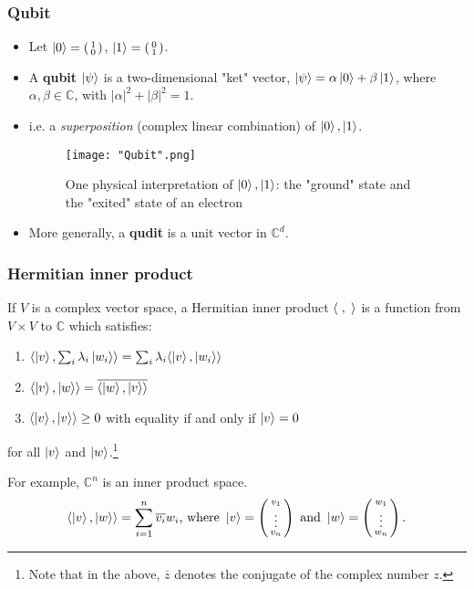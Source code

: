 \documentclass[handout, 10 pt]{beamer}
\newcommand{\icol}[1]{%
  \left(\begin{smallmatrix}#1\end{smallmatrix}\right)%
}
\begin{document}
\begin{frame}
\frametitle{Qubit}

\begin{itemize}
    \item Let $\ket{0} = \icol{1\\0}$, $\ket{1} = \icol{0\\1}$.
    \pause
    \item A \textbf{qubit} $\ket{\psi}$ is a two-dimensional "ket" vector, $\ket{\psi}=\alpha\ket{0}+\beta\ket{1}$, 
where $\alpha,\beta\in\mathbb{C}$, with $|\alpha|^2+|\beta|^2=1$.
\pause
\item i.e. a \textit{superposition} (complex linear combination) of $\ket{0}, \ket{1}$.
\pause
    \begin{figure}[h]
    \centering
    \texttt{[image: "Qubit".png]}
    \caption{One physical interpretation of $\ket{0},\ket{1}$: the "ground" state and the "exited" state of an electron}
    \label{fig: qubit}
    \end{figure}
\pause
\item More generally, a \textbf{qudit} is a unit vector in ${\mathbb{C}}^d$.
\end{itemize}
\end{frame}

\begin{frame}

\frametitle{Hermitian inner product}

If $V$ is a complex vector space, a Hermitian inner product $\langle\hspace{.1cm},\hspace{.1cm}\rangle$ is a function from $V \times V$ to $\mathbb{C}$ which satisfies: 
\pause
\begin{enumerate}
\item $\langle\ket{v}, \sum_i \lambda_i \ket{w_i}\rangle=\sum_i \lambda_i \langle\ket{v}, \ket{w_i}\rangle$
\pause
\item $\langle\ket{v}, \ket{w}\rangle=\overline{\langle\ket{w}, \ket{v}\rangle}$
\pause
\item $\langle\ket{v}, \ket{v}\rangle \ge 0$ \textrm{ with equality if and only if }$\ket{v}=0$
\pause
\end{enumerate}
for all $\ket{v}$ and $\ket{w}$.\footnote{Note that in the above, $\overline{z}$ denotes the conjugate of the complex number $z$.} 

\bigskip
For example, $\mathbb{C}^n$ is an inner product space.
\begin{equation} \label{inner product defn}
  \langle \ket{v},\ket{w}\rangle=\sum\limits_{i=1}^n \overline{v_i} w_i \textrm{, where }
  \ket{v}=\icol{v_1\\ \vdots\\v_n} \textrm{ and }\ket{w}=\icol{w_1\\ \vdots\\w_n}.
\end{equation}
\end{frame}
\end{document}
